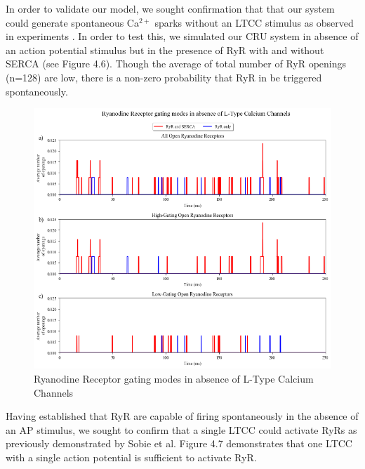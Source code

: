\documentclass[12pt]{ucsddissertation}
\begin{document}
In order to validate our model, we sought confirmation that that our system could generate spontaneous Ca$^{2+}$ sparks without an LTCC stimulus as observed in experiments \cite{Cheng1993,Lopez-Lopez1994,Cannell1995}. In order to test this, we simulated our CRU system in absence of an action potential stimulus but in the presence of RyR with and without SERCA (see Figure 4.6). Though the average of total number of RyR openings (n=128) are low, there is a non-zero probability that RyR in be triggered spontaneously.

\setcounter{figure}{5}
\begin{figure}
	\includegraphics[scale=0.6]{buffer_fluo_RyR_r_Comparison.png}
	\caption{Ryanodine Receptor gating modes in absence of L-Type Calcium Channels} 
\label{fig:Buffer RyR} 
\end{figure}

Having established that RyR are capable of firing spontaneously in the absence of an AP stimulus, we sought to confirm that a single LTCC could activate RyRs as previously demonstrated by Sobie et al\cite{Sobie2002}. Figure 4.7 demonstrates that one LTCC with a single action potential is sufficient to activate RyR. 
\end{document}
